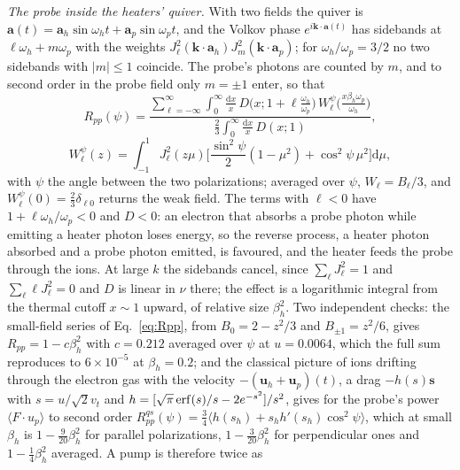 \documentclass[11pt]{article}
\numberwithin{equation}{section}
\newcommand{\dd}{\mathrm d}
\begin{document}
{\noindent}\emph{The probe inside the heaters' quiver.} With two fields the quiver is
$\mathbf a(t)=\mathbf a_h\sin\omega_ht+\mathbf a_p\sin\omega_pt$, and the Volkov phase
$e^{i\mathbf k\cdot\mathbf a(t)}$ has sidebands at $\ell\omega_h+m\omega_p$ with the weights
$J_\ell^2(\mathbf k\cdot\mathbf a_h)J_m^2(\mathbf k\cdot\mathbf a_p)$; for $\omega_h/\omega_p=3/2$
no two sidebands with $|m|\le1$ coincide. The probe's photons are counted by $m$, and to
second order in the probe field only $m=\pm1$ enter, so that
\begin{equation}
R_{pp}(\psi)=\frac{\displaystyle\sum_{\ell=-\infty}^\infty\int_0^\infty\frac{\dd x}{x}\,
D\Big(x;1+\ell\frac{\omega_h}{\omega_p}\Big)\,W_\ell^\psi\Big(\frac{x\beta_h\omega_p}{\omega_h}\Big)}
{\displaystyle\frac23\int_0^\infty\frac{\dd x}{x}\,D(x;1)},
\label{eq:Rpp}
\end{equation}
\begin{equation}
W_\ell^\psi(z)=\int_{-1}^1J_\ell^2(z\mu)\Big[\frac{\sin^2\psi}{2}(1-\mu^2)+\cos^2\psi\,\mu^2\Big]\dd\mu,
\label{eq:W}
\end{equation}
with $\psi$ the angle between the two polarizations; averaged over $\psi$,
$W_\ell=B_\ell/3$, and $W_\ell^\psi(0)=\tfrac23\delta_{\ell0}$ returns the weak field. The
terms with $\ell<0$ have $1+\ell\omega_h/\omega_p<0$ and $D<0$: an electron that absorbs a
probe photon while emitting a heater photon loses energy, so the reverse process, a heater
photon absorbed and a probe photon emitted, is favoured, and the heater feeds the probe
through the ions. At large $k$ the sidebands cancel, since $\sum_\ell J_\ell^2=1$ and
$\sum_\ell\ell J_\ell^2=0$ and $D$ is linear in $\nu$ there; the effect is a logarithmic
integral from the thermal cutoff $x\sim1$ upward, of relative size $\beta_h^2$. Two
independent checks: the small-field series of Eq.~\eqref{eq:Rpp}, from
$B_0=2-z^2/3$ and $B_{\pm1}=z^2/6$, gives $R_{pp}=1-c\beta_h^2$ with $c=0.212$ averaged
over $\psi$ at $u=0.0064$, which the full sum reproduces to $6\times10^{-5}$ at
$\beta_h=0.2$; and the classical picture of ions drifting through the electron gas with
the velocity $-(\mathbf u_h+\mathbf u_p)(t)$, a drag $-h(s)\mathbf s$ with $s=u/\sqrt2v_t$
and $h=[\sqrt\pi\,{\rm erf}(s)/s-2e^{-s^2}]/s^2$, gives for the probe's power
$\langle F\cdot u_p\rangle$ to second order
$R^{qs}_{pp}(\psi)=\tfrac34\langle h(s_h)+s_hh'(s_h)\cos^2\psi\rangle$, which at small
$\beta_h$ is $1-\tfrac{9}{20}\beta_h^2$ for parallel polarizations, $1-\tfrac{3}{20}\beta_h^2$
for perpendicular ones and $1-\tfrac14\beta_h^2$ averaged. A pump is therefore twice as
\end{document}
